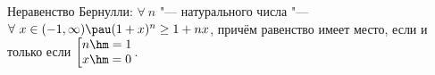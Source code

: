 \label{Bern}
    Неравенство Бернулли: $\forall\  n$ "--- натурального числа "--- $\forall\  x\in(-1,\infty)\pau (1+x)^n\geq1+nx$,
     причём равенство имеет место, если и только если $\left[\begin{matrix}n\hm=1\\x\hm=0\end{matrix}\right.$.
